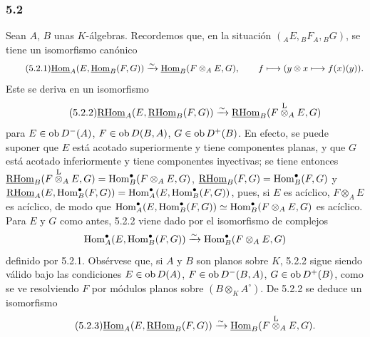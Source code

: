 \subsubsection*{5.2}

Sean $A$, $B$ unas $K$-álgebras. Recordemos que, en la situación $({}_AE,{}_BF_A,{}_BG)$, se tiene un isomorfismo canónico
\begin{equation}\tag{5.2.1}
\underline{\operatorname{Hom}}_A(E,\underline{\operatorname{Hom}}_B(F,G))\xrightarrow{\sim}\underline{\operatorname{Hom}}_B(F\otimes_AE,G),\qquad
f\longmapsto (y\otimes x\longmapsto f(x)(y)).
\end{equation}
Este se deriva en un isomorfismo
\begin{equation}\tag{5.2.2}
\underline{\mathrm{RHom}}_A(E,\underline{\mathrm{RHom}}_B(F,G))\xrightarrow{\sim}\underline{\mathrm{RHom}}_B(F\overset{\mathrm L}{\otimes}_AE,G)
\end{equation}
para $E\in\operatorname{ob} D^-(A)$, $F\in\operatorname{ob} D(B,A)$, $G\in\operatorname{ob} D^+(B)$. En efecto, se puede suponer que $E$ está acotado superiormente y tiene componentes planas, y que $G$ está acotado inferiormente y tiene componentes inyectivas; se tiene entonces $\underline{\mathrm{RHom}}_B(F\overset{\mathrm L}{\otimes}_AE,G)=\operatorname{Hom}_B^\bullet(F\otimes_AE,G)$, $\underline{\mathrm{RHom}}_B(F,G)=\operatorname{Hom}_B^\bullet(F,G)$ y $\underline{\mathrm{RHom}}_A(E,\operatorname{Hom}_B^\bullet(F,G))=\operatorname{Hom}_A^\bullet(E,\operatorname{Hom}_B^\bullet(F,G))$, pues, si $E$ es acíclico, $F\otimes_AE$ es acíclico, de modo que $\operatorname{Hom}_A^\bullet(E,\operatorname{Hom}_B^\bullet(F,G))\simeq\operatorname{Hom}_B^\bullet(F\otimes_AE,G)$ es acíclico. Para $E$ y $G$ como antes, 5.2.2 viene dado por el isomorfismo de complejos
\[
\operatorname{Hom}_A^\bullet(E,\operatorname{Hom}_B^\bullet(F,G))\xrightarrow{\sim}\operatorname{Hom}_B^\bullet(F\otimes_AE,G)
\]
definido por 5.2.1. Obsérvese que, si $A$ y $B$ son planos sobre $K$, 5.2.2 sigue siendo válido bajo las condiciones $E\in\operatorname{ob} D(A)$, $F\in\operatorname{ob} D^-(B,A)$, $G\in\operatorname{ob} D^+(B)$, como se ve resolviendo $F$ por módulos planos sobre $(B\otimes_KA^\circ)$. De 5.2.2 se deduce un isomorfismo
\begin{equation}\tag{5.2.3}
\underline{\operatorname{Hom}}_A(E,\underline{\mathrm{RHom}}_B(F,G))\xrightarrow{\sim}\underline{\operatorname{Hom}}_B(F\overset{\mathrm L}{\otimes}_AE,G).
\end{equation}
